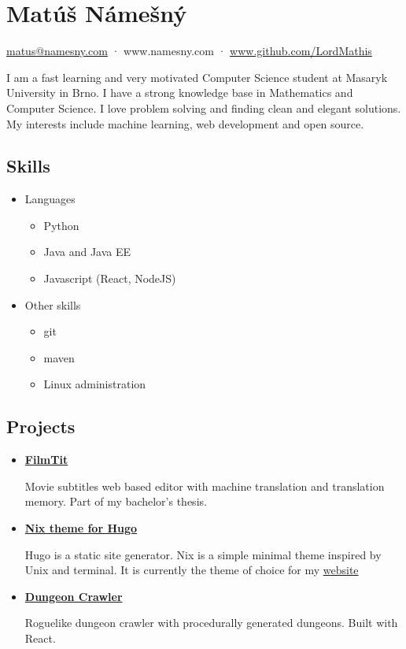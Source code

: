 \documentclass[a4,12pt]{article}
\providecommand{\tightlist}{%
  \setlength{\itemsep}{0pt}\setlength{\parskip}{0pt}}
\begin{document}
\section*{Matúš Námešný}


\begin{center}
\href{mailto:matus@namesny.com}{matus@namesny.com} · www.namesny.com · \href{www.github.com/LordMathis}{www.github.com/LordMathis}
\end{center}

I am a fast learning and very motivated Computer Science student at
Masaryk University in Brno. I have a strong knowledge base in
Mathematics and Computer Science. I love problem solving and finding
clean and elegant solutions. My interests include machine learning, web
development and open source.


\subsection*{Skills}\label{skills}

\begin{itemize}
\tightlist
\item
  Languages
  \begin{itemize}
  \tightlist
  \item
    Python
  \item
    Java and Java EE
  \item
    Javascript (React, NodeJS)
  \end{itemize}
\item
  Other skills
  \begin{itemize}
  \tightlist
  \item
    git
  \item
    maven
  \item
    Linux administration
  \end{itemize}
\end{itemize}

\subsection*{Projects}\label{projects}

\begin{itemize}
\item
  \textbf{\href{https://www.github.com/LordMathis/FilmTit}{FilmTit}}

  Movie subtitles web based editor with machine translation and
  translation memory. Part of my bachelor's thesis.
\item
  \textbf{\href{https://www.github.com/LordMathis/hugo-theme-nix}{Nix theme
  for Hugo}}

  Hugo is a static site generator. Nix is a simple minimal theme
  inspired by Unix and terminal. It is currently the theme of choice for
  my \href{https://namesny.com}{website}
\item
  \textbf{\href{https://www.github.com/LordMathis/dungeon-crawler}{Dungeon
  Crawler}}

  Roguelike dungeon crawler with procedurally generated dungeons. Built
  with React.
\end{itemize}
\end{document}

